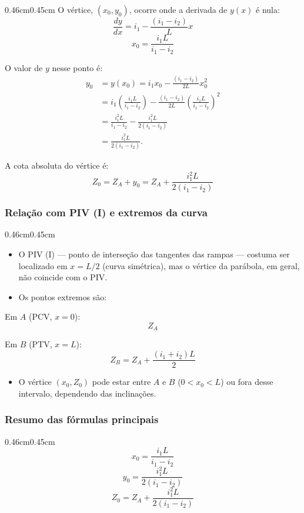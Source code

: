 \documentclass[12pt,letterpaper]{article}
\newenvironment{corpo}{\begin{adjustwidth}{0.46cm}{0.45cm}\justifying}{\end{adjustwidth}}
\begin{document}
\begin{corpo}
O vértice, $(x_0,y_0)$, ocorre onde a derivada de $y(x)$ é nula:
\[
\frac{dy}{dx}=i_1-\frac{(i_1-i_2)}{L}x
\]
\[
 x_0=\frac{i_1L}{i_1-i_2}
\]

O valor de $y$ nesse ponto é:
\[
\begin{aligned}
y_0&=y(x_0)=i_1x_0-\frac{(i_1-i_2)}{2L}x_0^2 \\
&=i_1\left(\frac{i_1L}{i_1-i_2}\right)
-\frac{(i_1-i_2)}{2L}\left(\frac{i_1L}{i_1-i_2}\right)^2 \\
&=\frac{i_1^2L}{i_1-i_2}-\frac{i_1^2L}{2(i_1-i_2)} \\
&=\frac{i_1^2L}{2(i_1-i_2)}.
\end{aligned}
\]

A cota absoluta do vértice é:
\[
 Z_0=Z_A+y_0=Z_A+\frac{i_1^2L}{2(i_1-i_2)}
\]
\end{corpo}

\subsubsection*{Relação com PIV (I) e extremos da curva}

\begin{corpo}
\begin{itemize}
    \item O PIV (I) — ponto de interseção das tangentes das rampas — costuma ser localizado em $x=L/2$ (curva simétrica), mas o vértice da parábola, em geral, não coincide com o PIV.
    \item Os pontos extremos são:
\end{itemize}

Em $A$ (PCV, $x=0$):
\[
 Z_A
\]

Em $B$ (PTV, $x=L$):
\[
 Z_B=Z_A+\frac{(i_1+i_2)L}{2}
\]

\begin{itemize}
    \item O vértice $(x_0,Z_0)$ pode estar entre $A$ e $B$ ($0<x_0<L$) ou fora desse intervalo, dependendo das inclinações.
\end{itemize}
\end{corpo}

\subsubsection*{Resumo das fórmulas principais}

\begin{corpo}
\[
 x_0=\frac{i_1L}{i_1-i_2}
\]
\[
 y_0=\frac{i_1^2L}{2(i_1-i_2)}
\]
\[
 Z_0=Z_A+\frac{i_1^2L}{2(i_1-i_2)}
\]
\end{corpo}
\end{document}
